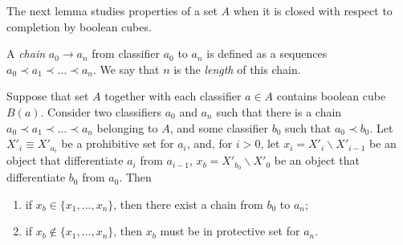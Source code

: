\documentclass{article}
\renewcommand{\emph}[1]{\textit{#1}}
\begin{document}
The next lemma studies properties of a set $A$ when it is closed with respect to completion by boolean cubes.

A \emph{chain} $a_0 \rightarrow a_n$ from classifier $a_0$ to $a_n$ is defined as a sequences $a_0 \prec a_1 \prec \dots \prec a_n$.
We say that $n$ is the \emph{length }of this chain.

\begin{lemma}
\label{chainLemma}
Suppose that set $A$ together with each classifier $a \in A$ contains boolean cube $B(a)$.
Consider two classifiers $a_0$ and $a_n$ such that there is a chain $a_0 \prec a_1 \prec \dots \prec a_n$ belonging to $A$,
and some classifier $b_0$ such that $a_0 \prec b_0$.
Let $X'_i \equiv X'_{a_i}$ be a prohibitive set for $a_i$,
and, for $i > 0$, let $x_i = X'_i \backslash X'_{i - 1}$ be an object that differentiate $a_i$ from $a_{i-1}$,
$x_b = X'_{b_0} \backslash X'_0$ be an object that differentiate $b_0$ from $a_0$. Then
\begin{enumerate}
    \item if $x_b \in \{x_1, \dots, x_n\}$, then there exist a chain from $b_0$ to $a_n$;
    \item if $x_b \not\in \{x_1, \dots, x_n\}$, then $x_b$ must be in protective set for $a_n$.
\end{enumerate}
\end{lemma}
\end{document}
